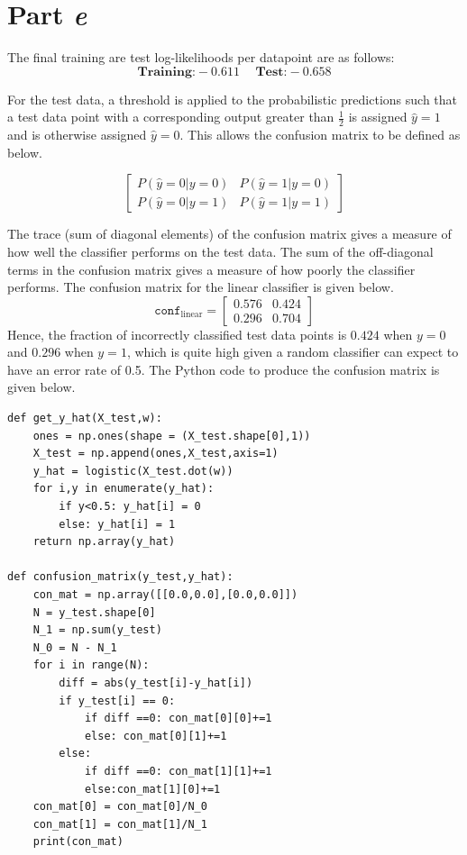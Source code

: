 \documentclass[twocolumn]{article}
\begin{document}
\section{Part \textit{e}}

The final training are test log-likelihoods per datapoint are as follows:
$$\textbf{Training:}-0.611\hspace{15pt} \textbf{Test:}-0.658$$

For the test data, a threshold is applied to the probabilistic predictions such that a test data point with a corresponding output greater than $\frac{1}{2}$ is assigned $\hat{y}=1$ and is otherwise assigned $\hat{y}=0$. This allows the confusion matrix to be defined as below.

$$\begin{bmatrix} P(\hat{y}=0|y=0) & P(\hat{y}=1|y=0) \\ P(\hat{y}=0|y=1) & P(\hat{y}=1|y=1) \end{bmatrix}$$

The trace (sum of diagonal elements) of the confusion matrix gives a measure of how well the classifier performs on the test data. The sum of the off-diagonal terms in the confusion matrix gives a measure of how poorly the classifier performs. The confusion matrix for the linear classifier is given below.
$$\texttt{conf}_{\text{linear}}=\begin{bmatrix} 0.576 & 0.424 \\ 0.296 & 0.704 \end{bmatrix}$$
Hence, the fraction of incorrectly classified test data points is $0.424$ when $y=0$ and $0.296$ when $y=1$, which is quite high given a random classifier can expect to have an error rate of 0.5. The Python code to produce the confusion matrix is given below.

\begin{verbatim}
def get_y_hat(X_test,w):
    ones = np.ones(shape = (X_test.shape[0],1))
    X_test = np.append(ones,X_test,axis=1)
    y_hat = logistic(X_test.dot(w))
    for i,y in enumerate(y_hat):
        if y<0.5: y_hat[i] = 0
        else: y_hat[i] = 1
    return np.array(y_hat)

def confusion_matrix(y_test,y_hat):
    con_mat = np.array([[0.0,0.0],[0.0,0.0]])
    N = y_test.shape[0]
    N_1 = np.sum(y_test)
    N_0 = N - N_1
    for i in range(N):
        diff = abs(y_test[i]-y_hat[i])
        if y_test[i] == 0:
            if diff ==0: con_mat[0][0]+=1
            else: con_mat[0][1]+=1
        else:
            if diff ==0: con_mat[1][1]+=1
            else:con_mat[1][0]+=1
    con_mat[0] = con_mat[0]/N_0
    con_mat[1] = con_mat[1]/N_1
    print(con_mat)

\end{verbatim}
\end{document}
